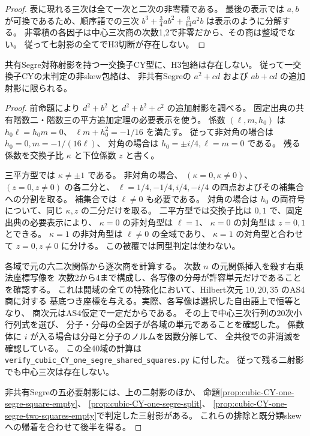 \begin{proof}
表に現れる三次は全て一次と二次の非零積である。
最後の表示では $a,b$ が可換であるため、順序語での三次
$b^3+\frac34 ab^2+\frac9{64}a^2b$ は表示のように分解する。
非零積の各因子は中心三次商の次数1,2で非零だから、その商は整域でない。
従って七射影の全てでH3切断が存在しない。
\end{proof}

\begin{theorem}\label{thm:cubic-CY-one-segre-all-shared-empty}
共有Segre対称射影を持つ一交換子CY型に、H3包絡は存在しない。
従って一交換子CYの未判定の非skew包絡は、
非共有Segreの $a^2+cd$ および $ab+cd$ の追加射影に限られる。
\end{theorem}
\begin{proof}
前命題により $d^2+b^2$ と $d^2+b^2+c^2$ の追加射影を調べる。
固定出典\cite{AS4CYpinned}の共有階数二・階数三の平方追加定理の必要表示を使う。
係数 $(\ell,m,h_0)$ は $h_0\ell=h_0m=0$、
$\ell m+h_0^2=-1/16$ を満たす。
従って非対角の場合は $h_0=0,m=-1/(16\ell)$、
対角の場合は $h_0=\pm i/4,\ell=m=0$ である。
残る係数を交換子比 $\kappa$ と下位係数 $z$ と書く。

三平方型では $\kappa\ne\pm1$ である。
非対角の場合、
$(\kappa=0,\kappa\ne0)$、
$(z=0,z\ne0)$ の各二分と、
$\ell=1/4,-1/4,i/4,-i/4$ の四点およびその補集合への分割を取る。
補集合では $\ell\ne0$ も必要である。
対角の場合は $h_0$ の両符号について、同じ $\kappa,z$ の二分だけを取る。
二平方型では交換子比は $0,1$ で、固定出典の必要表示により、
$\kappa=0$ の非対角型は $\ell=1$、
$\kappa=0$ の対角型は $z=0,1$ とできる。
$\kappa=1$ の非対角型は $\ell\ne0$ の全域であり、
$\kappa=1$ の対角型と合わせて $z=0,z\ne0$ に分ける。
この被覆では同型判定は使わない。

各域で元の六二次関係から逐次商を計算する。
次数 $n$ の元関係挿入を殺す右乗法座標写像を
次数2から4まで構成し、各写像の分母が許容単元だけであることを確認する。
これは開域の全ての特殊化において、Hilbert次元 $10,20,35$ のAS4商に対する
基底つき座標を与える。実際、各写像は選択した自由語上で恒等となり、
商次元はAS4仮定で一定だからである。
その上で中心三次行列の20次小行列式を選び、
分子・分母の全因子が各域の単元であることを確認した。
係数体に $i$ が入る場合は分母と分子のノルムを因数分解して、
全共役での非消滅を確認している。
この全40域の計算は
\texttt{verify\_cubic\_CY\_one\_segre\_shared\_squares.py} に付した。
従って残る二射影でも中心三次は存在しない。

非共有Segreの五必要射影には、上の二射影のほか、
命題\ref{prop:cubic-CY-one-segre-square-empty}、
\ref{prop:cubic-CY-one-segre-split}、
\ref{prop:cubic-CY-one-segre-two-squares-empty}で判定した三射影がある。
これらの排除と既分類skewへの帰着を合わせて後半を得る。
\end{proof}
